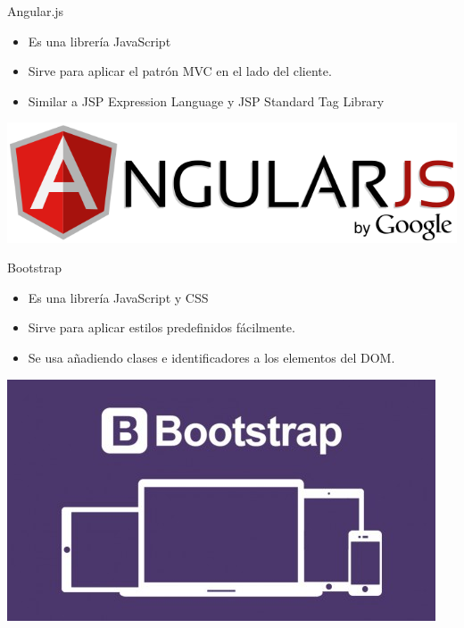 \documentclass{beamer}
\begin{document}
            \begin{frame}{Angular.js}
                \begin{minipage}{0.70\textwidth}
                    \begin{itemize}
                        \item Es una librería JavaScript
                        \item Sirve para aplicar el patrón MVC en el lado del cliente.
                        \item Similar a JSP Expression Language y JSP Standard Tag Library
                    \end{itemize}
                \end{minipage}
                \begin{minipage}{0.25\textwidth}
                    \includegraphics[width=\textwidth]{res/logo-angular}
                \end{minipage}
            \end{frame}

            \begin{frame}{Bootstrap}
                \begin{minipage}{0.70\textwidth}
                    \begin{itemize}
                        \item Es una librería JavaScript y CSS
                        \item Sirve para aplicar estilos predefinidos fácilmente.
                        \item Se usa añadiendo clases e identificadores a los elementos del DOM.
                    \end{itemize}
                \end{minipage}
                \begin{minipage}{0.25\textwidth}
                    \includegraphics[width=\textwidth]{res/logo-bootstrap}
                \end{minipage}
            \end{frame}
\end{document}

